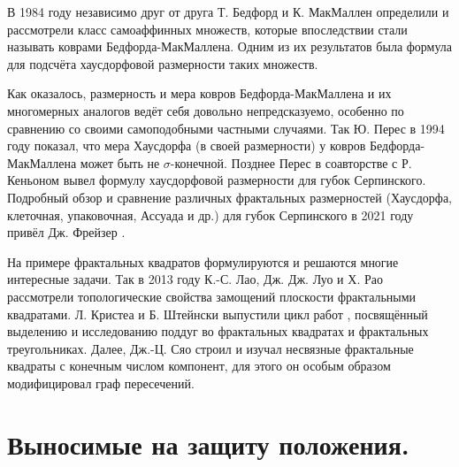 


В 1984 году независимо друг от друга Т. Бедфорд \cite{Bedford1984} и К. МакМаллен \cite{McMullen1984} определили и рассмотрели класс самоаффинных множеств, которые впоследствии стали называть коврами Бедфорда-МакМаллена.
Одним из их результатов была формула для подсчёта хаусдорфовой размерности   таких множеств.

Как оказалось, размерность и мера ковров Бедфорда-МакМаллена и их многомерных аналогов ведёт себя довольно непредсказуемо, особенно по сравнению со своими самоподобными частными случаями.
Так Ю. Перес \cite{Peres1994} в 1994 году показал, что мера Хаусдорфа (в своей размерности) у ковров Бедфорда-МакМаллена может быть не $\sigma$-конечной.
Позднее Перес в соавторстве с Р. Кеньоном \cite{KenyonPeres1996} вывел формулу хаусдорфовой размерности   для губок Серпинского.
Подробный обзор и сравнение различных фрактальных размерностей (Хаусдорфа, клеточная, упаковочная, Ассуада и др.) для губок Серпинского в 2021 году привёл Дж. Фрейзер \cite{Fraser_2021}.

На примере фрактальных квадратов формулируются и решаются многие интересные задачи. 
Так в 2013 году К.-С. Лао, Дж. Дж. Луо и Х. Рао \cite{LLR2013} рассмотрели топологические свойства замощений плоскости фрактальными квадратами.
Л. Кристеа и Б. Штейнски выпустили цикл работ \cite{CS1,CS2,CS3}, посвящённый выделению и исследованию поддуг во фрактальных квадратах и фрактальных треугольниках.
Далее, Дж.-Ц. Сяо \cite{Xiao2021} строил и изучал несвязные фрактальные квадраты с конечным числом компонент, для этого он особым образом модифицировал граф пересечений.



\section{Выносимые на защиту положения.}


